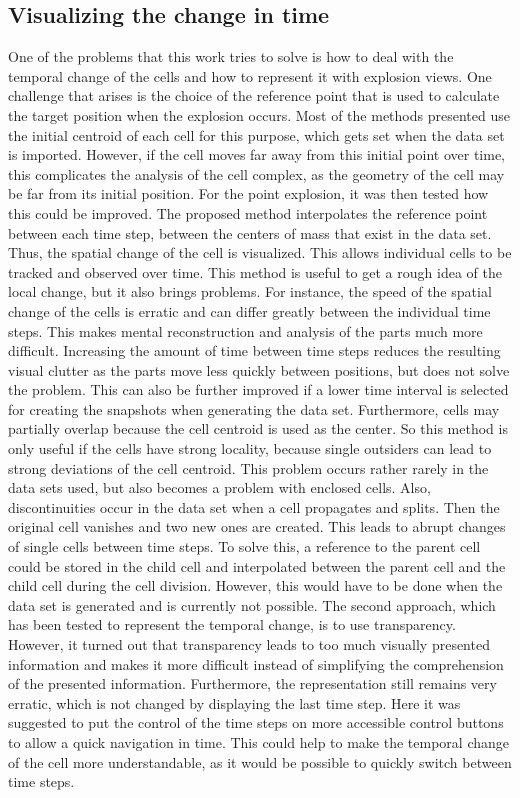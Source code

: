 \subsection{Visualizing the change in time}
One of the problems that this work tries to solve is how to deal with the temporal change of the cells and how to represent it with explosion views. One challenge that arises is the choice of the reference point that is used to calculate the target position when the explosion occurs. Most of the methods presented use the initial centroid of each cell for this purpose, which gets set when the data set is imported. However, if the cell moves far away from this initial point over time, this complicates the analysis of the cell complex, as the geometry of the cell may be far from its initial position.
For the point explosion, it was then tested how this could be improved. The proposed method interpolates the reference point between each time step, between the centers of mass that exist in the data set. Thus, the spatial change of the cell is visualized. This allows individual cells to be tracked and observed over time. This method is useful to get a rough idea of the local change, but it also brings problems. For instance, the speed of the spatial change of the cells is erratic and can differ greatly between the individual time steps. This makes mental reconstruction and analysis of the parts much more difficult. Increasing the amount of time between time steps reduces the resulting visual clutter as the parts move less quickly between positions, but does not solve the problem. This can also be further improved if a lower time interval is selected for creating the snapshots when generating the data set. Furthermore, cells may partially overlap because the cell centroid is used as the center. So this method is only useful if the cells have strong locality, because single outsiders can lead to strong deviations of the cell centroid. This problem occurs rather rarely in the data sets used, but also becomes a problem with enclosed cells. Also, discontinuities occur in the data set when a cell propagates and splits. Then the original cell vanishes and two new ones are created. This leads to abrupt changes of single cells between time steps. To solve this, a reference to the parent cell could be stored in the child cell and interpolated between the parent cell and the child cell during the cell division. However, this would have to be done when the data set is generated and is currently not possible.
The second approach, which has been tested to represent the temporal change, is to use transparency. However, it turned out that transparency leads to too much visually presented information and makes it more difficult instead of simplifying the comprehension of the presented information. Furthermore, the representation still remains very erratic, which is not changed by displaying the last time step. Here it was suggested to put the control of the time steps on more accessible control buttons to allow a quick navigation in time. This could help to make the temporal change of the cell more understandable, as it would be possible to quickly switch between time steps.
